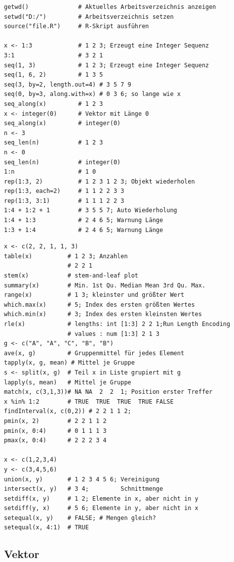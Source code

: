 \documentclass[10pt,twocolumn]{scrartcl}
\begin{document}
\begin{lstlisting}
getwd()              # Aktuelles Arbeitsverzeichnis anzeigen
setwd("D:/")         # Arbeitsverzeichnis setzen
source("file.R")     # R-Skript ausführen

x <- 1:3             # 1 2 3; Erzeugt eine Integer Sequenz
3:1                  # 3 2 1
seq(1, 3)            # 1 2 3; Erzeugt eine Integer Sequenz
seq(1, 6, 2)         # 1 3 5
seq(3, by=2, length.out=4) # 3 5 7 9
seq(0, by=3, along.with=x) # 0 3 6; so lange wie x
seq_along(x)         # 1 2 3
x <- integer(0)      # Vektor mit Länge 0
seq_along(x)         # integer(0)
n <- 3
seq_len(n)           # 1 2 3
n <- 0
seq_len(n)           # integer(0)
1:n                  # 1 0
rep(1:3, 2)          # 1 2 3 1 2 3; Objekt wiederholen
rep(1:3, each=2)     # 1 1 2 2 3 3
rep(1:3, 3:1)        # 1 1 1 2 2 3
1:4 + 1:2 + 1        # 3 5 5 7; Auto Wiederholung
1:4 + 1:3            # 2 4 6 5; Warnung Länge
1:3 + 1:4            # 2 4 6 5; Warnung Länge
\end{lstlisting}


\begin{lstlisting}
x <- c(2, 2, 1, 1, 3)
table(x)          # 1 2 3; Anzahlen
                  # 2 2 1
stem(x)           # stem-and-leaf plot
summary(x)        # Min. 1st Qu. Median Mean 3rd Qu. Max.
range(x)          # 1 3; kleinster und größter Wert
which.max(x)      # 5; Index des ersten größten Wertes
which.min(x)      # 3; Index des ersten kleinsten Wertes
rle(x)            # lengths: int [1:3] 2 2 1;Run Length Encoding
                  # values : num [1:3] 2 1 3
g <- c("A", "A", "C", "B", "B")
ave(x, g)         # Gruppenmittel für jedes Element
tapply(x, g, mean) # Mittel je Gruppe
s <- split(x, g)  # Teil x in Liste grupiert mit g
lapply(s, mean)   # Mittel je Gruppe
match(x, c(3,1,3))# NA NA  2  2  1; Position erster Treffer
x %in% 1:2        # TRUE  TRUE  TRUE  TRUE FALSE
findInterval(x, c(0,2)) # 2 2 1 1 2;
pmin(x, 2)        # 2 2 1 1 2
pmin(x, 0:4)      # 0 1 1 1 3
pmax(x, 0:4)      # 2 2 2 3 4

x <- c(1,2,3,4)
y <- c(3,4,5,6)
union(x, y)       # 1 2 3 4 5 6; Vereinigung
intersect(x, y)   # 3 4;         Schnittmenge
setdiff(x, y)     # 1 2; Elemente in x, aber nicht in y
setdiff(y, x)     # 5 6; Elemente in y, aber nicht in x
setequal(x, y)    # FALSE; # Mengen gleich?
setequal(x, 4:1)  # TRUE
\end{lstlisting}


\subsection{Vektor}
\end{document}
